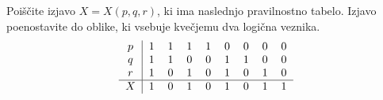 \documentclass{izpit}
\begin{document}
%


\naloga[\tocke{25}]

  \podnaloga[15]
    Poiščite izjavo $X = X(p, q, r)$, ki ima naslednjo pravilnostno tabelo.
    Izjavo poenostavite do oblike, ki vsebuje kvečjemu dva logična veznika.
    \[
      \begin{tabular}{c|cccccccc}
        $p$ & 1 & 1 & 1 & 1 & 0 & 0 & 0 & 0 \\
        $q$ & 1 & 1 & 0 & 0 & 1 & 1 & 0 & 0 \\
        $r$ & 1 & 0 & 1 & 0 & 1 & 0 & 1 & 0 \\\hline
        $X$ & 1 & 0 & 1 & 0 & 1 & 0 & 1 & 1 \\
      \end{tabular}
    \]
  
  \prostor[2] %
\end{document}
